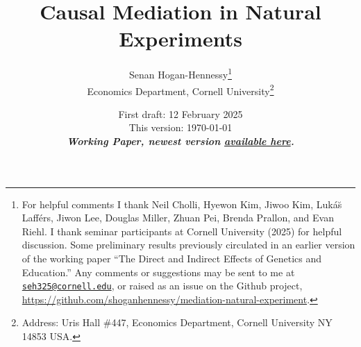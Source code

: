 \documentclass[notitlepage,12pt]{article}
\author{Senan Hogan-Hennessy\thanks{
    For helpful comments I thank
    Neil Cholli,
    Hyewon Kim,
    Jiwoo Kim,
    Luk\'a\u{s} Laff\'ers,
    Jiwon Lee,
    Douglas Miller,
    Zhuan Pei,
    Brenda Prallon,
    and
    Evan Riehl.
    I thank seminar participants at Cornell University (2025)
    for helpful discussion.
    Some preliminary results previously circulated in an earlier version of the working paper ``The Direct and Indirect Effects of Genetics and Education.''
    Any comments or suggestions may be sent to me at \href{mailto:seh325@cornell.edu}{\nolinkurl{seh325@cornell.edu}}, or raised as an issue on the Github project,
    \url{https://github.com/shoganhennessy/mediation-natural-experiment}.
    } \\
    \vspace{0.1cm}
    Economics Department, Cornell University\footnote{
        Address: Uris Hall \#447, Economics Department, Cornell University NY 14853 USA.
    }
}
\title{Causal Mediation in Natural Experiments}
\date{
    First draft: 12 February 2025 \\
    This version:
    \today \\ \vspace{0.25cm}
    \textbf{\textit{Working Paper,
    newest version
    \href{https://raw.githubusercontent.com/shoganhennessy/mediation-natural-experiment/main/mediation-natural-experiment-2025.pdf}{available here}.}}
    \vspace{-1.0cm}
}
\begin{document}
\clearpage
\maketitle
\thispagestyle{empty}
\begin{abstract}
    
\end{abstract}

\newpage
\setcounter{page}{1}
\onehalfspacing
\noindent









\singlespacing


\newpage

\end{document}
